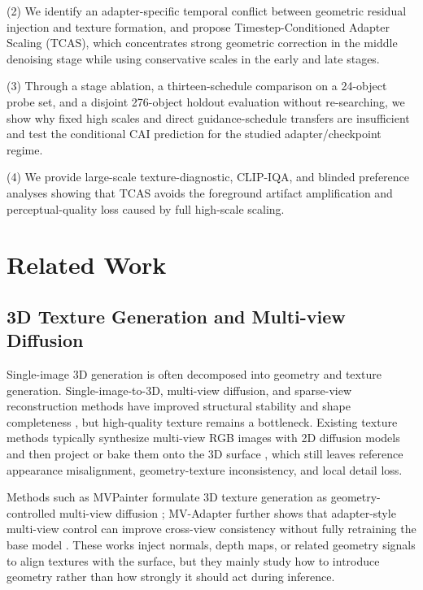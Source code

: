 \documentclass[times,twocolumn,final]{elsarticle}
\begin{document}
(2) We identify an adapter-specific temporal conflict between geometric residual injection and texture formation, and propose Timestep-Conditioned Adapter Scaling (TCAS), which concentrates strong geometric correction in the middle denoising stage while using conservative scales in the early and late stages.

(3) Through a stage ablation, a thirteen-schedule comparison on a 24-object probe set, and a disjoint 276-object holdout evaluation without re-searching, we show why fixed high scales and direct guidance-schedule transfers are insufficient and test the conditional CAI prediction for the studied adapter/checkpoint regime.

(4) We provide large-scale texture-diagnostic, CLIP-IQA, and blinded preference analyses showing that TCAS avoids the foreground artifact amplification and perceptual-quality loss caused by full high-scale scaling.

\section{Related Work}
\label{sec:related}

\subsection{3D Texture Generation and Multi-view Diffusion}
\label{subsec:3dtex}

Single-image 3D generation is often decomposed into geometry and texture generation. Single-image-to-3D, multi-view diffusion, and sparse-view reconstruction methods have improved structural stability and shape completeness \cite{liu2023zero1to3,shi2023zero123pp,liu2023syncdreamer,long2023wonder3d,shi2024mvdream,wang2023imagedream,xu2024instantmesh,ke2024era3d}, but high-quality texture remains a bottleneck. Existing texture methods typically synthesize multi-view RGB images with 2D diffusion models and then project or bake them onto the 3D surface \cite{chen2023text2tex,richardson2023texture,poole2023dreamfusion,chen2023fantasia3d}, which still leaves reference appearance misalignment, geometry-texture inconsistency, and local detail loss.

Methods such as MVPainter formulate 3D texture generation as geometry-controlled multi-view diffusion \cite{shao2025mvpainter}; MV-Adapter further shows that adapter-style multi-view control can improve cross-view consistency without fully retraining the base model \cite{huang2024mvadapter}. These works inject normals, depth maps, or related geometry signals to align textures with the surface, but they mainly study how to introduce geometry rather than how strongly it should act during inference.
\end{document}
